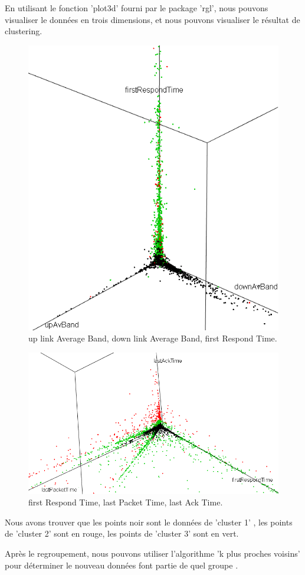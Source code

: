 En utilisant le fonction 'plot3d' fourni par le package 'rgl', nous pouvons visualiser le données en trois dimensions, et nous pouvons visualiser le résultat de clustering.


\begin{figure}[H]
\centering
\includegraphics[width=0.6\linewidth]{images/kmeqn}
\caption{up link Average Band, down link Average Band, first Respond Time.}
\label{fig:kmeqn}
\end{figure}
\begin{figure}[H]
\centering
\includegraphics[width=0.8\linewidth]{images/3delai}
\caption{first Respond Time, last Packet Time, last Ack Time.}
\label{fig:3delai}
\end{figure}

Nous avons trouver que les points noir sont le données de 'cluster 1' , les points de 'cluster 2' sont en rouge, les points de 'cluster 3' sont en vert. 

Après le regroupement, nous pouvons utiliser l'algorithme 'k plus proches voisins' pour déterminer le nouveau données font partie de quel groupe .

